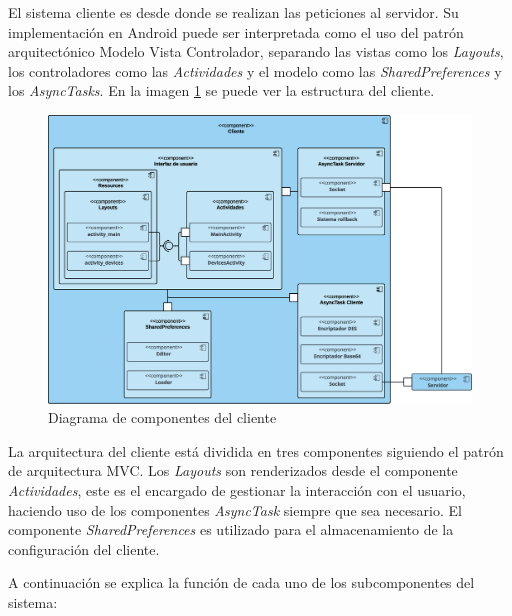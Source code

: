 \documentclass[12pt]{article}
\begin{document}
            El sistema cliente es desde donde se realizan las peticiones al servidor. Su implementación en Android puede ser interpretada como el uso del patrón arquitectónico Modelo Vista Controlador, separando las vistas como los \textit{Layouts}, los controladores como las \textit{Actividades} y el modelo como las \textit{SharedPreferences} y los \textit{AsyncTasks}. En la imagen \ref{fig:client_diagram} se puede ver la estructura del cliente.

            \begin{figure}[h!]
            \centering
                \includegraphics[scale=0.4]{client_diagram.eps}
                \caption*{Diagrama de componentes del cliente}
                \label{fig:client_diagram}
            \end{figure}

            La arquitectura del cliente está dividida en tres componentes siguiendo el patrón de arquitectura MVC. Los \textit{Layouts} son renderizados desde el componente \textit{Actividades}, este es el encargado de gestionar la interacción con el usuario, haciendo uso de los componentes \textit{AsyncTask} siempre que sea necesario. El componente \textit{SharedPreferences} es utilizado para el almacenamiento de la configuración del cliente.

            A continuación se explica la función de cada uno de los subcomponentes del sistema:
\end{document}
